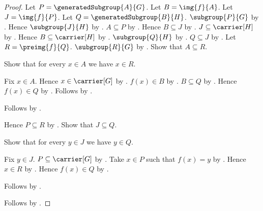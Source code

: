\begin{proof}
    Let $P=\generatedSubgroup{A}{G}$.
    Let $B=\img{f}{A}$.
    Let $J=\img{f}{P}$.
    Let $Q=\generatedSubgroup{B}{H}$.
    $\subgroup{P}{G}$ by
        .
    Hence $\subgroup{J}{H}$ by
        .
    $A\subseteq P$ by
        .
    Hence $B\subseteq J$ by .
    $J\subseteq\carrier[H]$ by .
    Hence $B\subseteq\carrier[H]$ by .
    $\subgroup{Q}{H}$ by
        .
    $Q\subseteq J$ by
        .
    Let $R=\preimg{f}{Q}$.
    $\subgroup{R}{G}$ by
        .
    Show that $A\subseteq R$.
    \begin{subproof}
        Show that for every $x\in A$ we have $x\in R$.
        \begin{subproof}
            Fix $x\in A$.
            Hence $x\in\carrier[G]$ by .
            $f(x)\in B$ by .
            $B\subseteq Q$ by
                .
            Hence $f(x)\in Q$ by .
            Follows by .
        \end{subproof}
        Follows by .
    \end{subproof}
    Hence $P\subseteq R$ by
        .
    Show that $J\subseteq Q$.
    \begin{subproof}
        Show that for every $y\in J$ we have $y\in Q$.
        \begin{subproof}
            Fix $y\in J$.
            $P\subseteq\carrier[G]$ by
                .
            Take $x\in P$ such that $f(x)=y$ by
                .
            Hence $x\in R$ by .
            Hence $f(x)\in Q$ by
                .
        \end{subproof}
        Follows by .
    \end{subproof}
    Follows by .
\end{proof}

